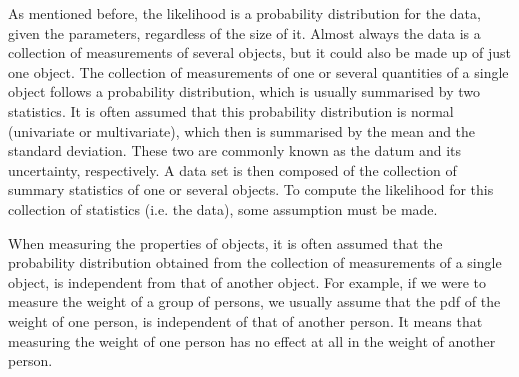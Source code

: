%

As mentioned before, the likelihood is a probability distribution for the data, given the parameters, regardless of the size of it. Almost always the data is a collection of measurements of several objects, but it could also be made up of just one object. The collection of measurements of one or several quantities of a single object follows a probability distribution, which is usually summarised by two statistics. It is often assumed that this probability distribution is normal (univariate or multivariate), which then is summarised by the mean and the standard deviation. These two are commonly known as the datum and its uncertainty, respectively. A data set is then composed of the collection of summary statistics of one or several objects. To compute the likelihood for this collection of statistics (i.e. the data), some assumption must be made. 

When measuring the properties of objects, it is often assumed that the probability distribution obtained from the collection of measurements of a single object, is independent from that of another object. For example, if we were to measure the weight of a group of persons, we usually assume that the \gls{pdf} of the weight of one person, is independent of that of another person. It means that measuring the weight of one person has no effect at all in the weight of another person.


